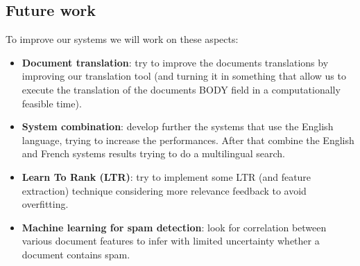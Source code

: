 \subsection{Future work}
\label{subsec:future}
To improve our systems we will work on these aspects:
\begin{itemize}
    \item \textbf{Document translation}: try to improve the documents translations by improving our translation tool (and turning it in something that allow us to execute the translation of the documents BODY field in a computationally feasible time).
    \item \textbf{System combination}: develop further the systems that use the English language, trying to increase the performances. After that combine the English and French systems results trying to do a multilingual search.
    \item \textbf{Learn To Rank (LTR)}: try to implement some LTR (and feature extraction) technique considering more relevance feedback to avoid overfitting.
    \item \textbf{Machine learning for spam detection}: look for correlation between various document features to infer with limited uncertainty whether a document contains spam.
\end{itemize}


